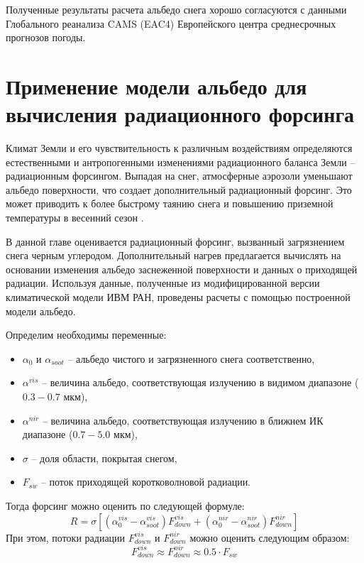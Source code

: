 \documentclass[a4paper, fontsize=14pt]{scrartcl}
\begin{document}
Полученные результаты расчета альбедо снега хорошо согласуются с данными Глобального реанализа CAMS (EAC4) Европейского центра среднесрочных прогнозов погоды.


\newpage
\section{Применение модели альбедо для вычисления радиационного форсинга}

Климат Земли и его чувствительность к различным воздействиям определяются естественными и антропогенными изменениями радиационного баланса Земли -- радиационным форсингом. Выпадая на снег, атмосферные аэрозоли уменьшают альбедо поверхности, что создает дополнительный радиационный форсинг. Это может приводить к более быстрому таянию снега и повышению приземной температуры в весенний сезон \cite{Chernenkov2021rus}. 

В данной главе оценивается радиационный форсинг, вызванный загрязнением снега черным углеродом. Дополнительный нагрев предлагается вычислять на основании изменения альбедо заснеженной поверхности и данных о приходящей радиации. Используя данные, полученные из модифицированной версии климатической модели ИВМ РАН, проведены расчеты с помощью построенной модели альбедо.

Определим необходимы переменные:
\begin{itemize}
    \item $\alpha_{0}$ и $\alpha_{soot}$ -- альбедо чистого и загрязненного снега соответственно,
    \item $\alpha^{vis}$ -- величина альбедо, соответствующая излучению в видимом диапазоне ($0.3-0.7$ мкм),
    \item $\alpha^{nir}$ -- величина альбедо, соответствующая излучению в ближнем ИК диапазоне ($0.7-5.0$ мкм),
    \item $\sigma$ -- доля области, покрытая снегом,
    \item $F_{sw}$ -- поток приходящей коротковолновой радиации.
\end{itemize}
Тогда форсинг можно оценить по следующей формуле:
\begin{equation}
    R = \sigma [ (\alpha_{0}^{vis} - \alpha_{soot}^{vis})F_{down}^{vis} + (\alpha_{0}^{nir} - \alpha_{soot}^{nir})F_{down}^{nir} ] \label{sysFORC}  
\end{equation}
При этом, потоки радиации $F_{down}^{vis}$ и $F_{down}^{nir}$ можно оценить следующим образом: 
\begin{equation}
    F_{down}^{vis} \approx F_{down}^{nir} \approx 0.5 \cdot F_{sw} \label{sys}  
\end{equation}
\end{document}
